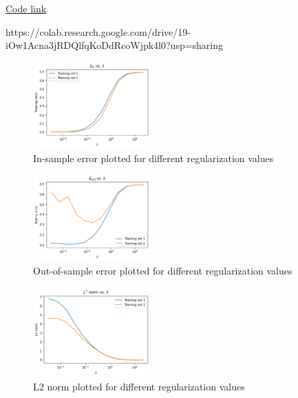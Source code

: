 \begin{solution}
  \href{https://colab.research.google.com/drive/19-iOw1Acna3jRDQlfqKoDdRcoWjpk4l0?usp=sharing}{Code link}

  https://colab.research.google.com/drive/19-iOw1Acna3jRDQlfqKoDdRcoWjpk4l0?usp=sharing

  \begin{figure}[H]
    \centering
    \includegraphics[width=0.4\textwidth]{images/2c_1.png}
    \caption{In-sample error plotted for different regularization values}
    \label{fig:2c_1}
  \end{figure}

  \begin{figure}[H]
    \centering
    \includegraphics[width=0.4\textwidth]{images/2c_2.png}
    \caption{Out-of-sample error plotted for different regularization values}
    \label{fig:2c_2}
  \end{figure}

  \begin{figure}[H]
    \centering
    \includegraphics[width=0.4\textwidth]{images/2c_3.png}
    \caption{L2 norm plotted for different regularization values}
    \label{fig:2c_3}
  \end{figure}
\end{solution}

